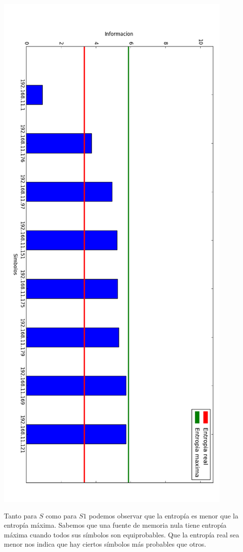 \includegraphics[scale=0.65]{imagenes/captura-red-trabajo-fuente-s1.png}

Tanto para $S$ como para $S1$ podemos observar que la entropía es menor que la entropía máxima. Sabemos que una fuente de memoria nula tiene entropía máxima cuando todos sus símbolos son equiprobables. Que la entropía real sea menor nos indica que hay ciertos símbolos más probables que otros. 

